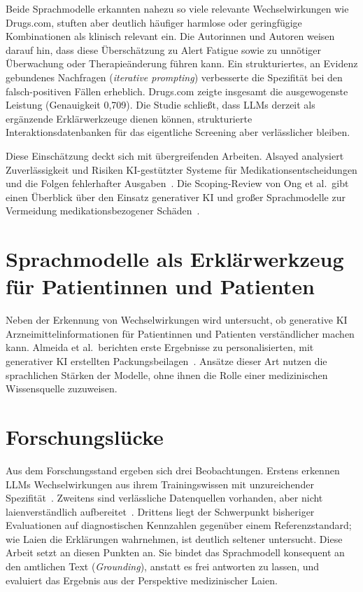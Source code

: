 Beide Sprachmodelle erkannten nahezu so viele relevante Wechselwirkungen wie Drugs.com, stuften aber deutlich häufiger harmlose oder geringfügige Kombinationen als klinisch relevant ein. Die Autorinnen und Autoren weisen darauf hin, dass diese Überschätzung zu Alert Fatigue sowie zu unnötiger Überwachung oder Therapieänderung führen kann. Ein strukturiertes, an Evidenz gebundenes Nachfragen (\emph{iterative prompting}) verbesserte die Spezifität bei den falsch-positiven Fällen erheblich. Drugs.com zeigte insgesamt die ausgewogenste Leistung (Genauigkeit 0{,}709). Die Studie schließt, dass LLMs derzeit als ergänzende Erklärwerkzeuge dienen können, strukturierte Interaktionsdatenbanken für das eigentliche Screening aber verlässlicher bleiben.

Diese Einschätzung deckt sich mit übergreifenden Arbeiten. Alsayed analysiert Zuverlässigkeit und Risiken KI-gestützter Systeme für Medikationsentscheidungen und die Folgen fehlerhafter Ausgaben~\cite{alsayed2026aigetswrongreliability}. Die Scoping-Review von Ong et al.\ gibt einen Überblick über den Einsatz generativer KI und großer Sprachmodelle zur Vermeidung medikationsbezogener Schäden~\cite{Ong2025}.

\section{Sprachmodelle als Erklärwerkzeug für Patientinnen und Patienten}

Neben der Erkennung von Wechselwirkungen wird untersucht, ob generative KI Arzneimittelinformationen für Patientinnen und Patienten verständlicher machen kann. Almeida et al.\ berichten erste Ergebnisse zu personalisierten, mit generativer KI erstellten Packungsbeilagen~\cite{Almeida2025}. Ansätze dieser Art nutzen die sprachlichen Stärken der Modelle, ohne ihnen die Rolle einer medizinischen Wissensquelle zuzuweisen.

\section{Forschungslücke}

Aus dem Forschungsstand ergeben sich drei Beobachtungen. Erstens erkennen LLMs Wechselwirkungen aus ihrem Trainingswissen mit unzureichender Spezifität~\cite{MOHAMMED2026100733}. Zweitens sind verlässliche Datenquellen vorhanden, aber nicht laienverständlich aufbereitet~\cite{openFDA}. Drittens liegt der Schwerpunkt bisheriger Evaluationen auf diagnostischen Kennzahlen gegenüber einem Referenzstandard; wie Laien die Erklärungen wahrnehmen, ist deutlich seltener untersucht. Diese Arbeit setzt an diesen Punkten an. Sie bindet das Sprachmodell konsequent an den amtlichen Text (\emph{Grounding}), anstatt es frei antworten zu lassen, und evaluiert das Ergebnis aus der Perspektive medizinischer Laien.
